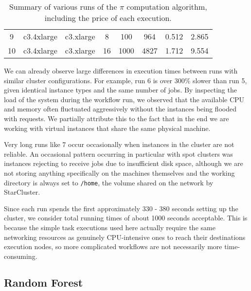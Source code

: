 \begin{table}[h]
\begin{adjustbox}{width=1\textwidth}
\begin{tabular}{cccccccc}
\multicolumn{1}{c|}{9} & \multicolumn{1}{c|}{c3.4xlarge} & \multicolumn{1}{c|}{c3.xlarge} & \multicolumn{1}{c|}{8} & \multicolumn{1}{c|}{100} & \multicolumn{1}{c|}{964} & \multicolumn{1}{c|}{0.512} & \multicolumn{1}{c|}{2.865} \\ \cline{2-8} 
\multicolumn{1}{c|}{10} & \multicolumn{1}{c|}{c3.4xlarge} & \multicolumn{1}{c|}{c3.xlarge} & \multicolumn{1}{c|}{16} & \multicolumn{1}{c|}{1000} & \multicolumn{1}{c|}{4827} & \multicolumn{1}{c|}{1.712} & \multicolumn{1}{c|}{9.554} \\ \cline{2-8} 
\end{tabular}
\end{adjustbox}
\caption{Summary of various runs of the $\pi$ computation algorithm, including the price of each execution.}
\label{PiTable}
\end{table}

We can already observe large differences in execution times between runs with similar cluster configurations. For example, run 6 is over 300\% slower than run 5, given identical instance types and the same number of jobs. By inspecting the load of the system during the workflow run, we observed that the available CPU and memory often fluctuated aggressively without the instances being flooded with requests. We partially attribute this to the fact that in the end we are working with virtual instances that share the same physical machine.

Very long runs like 7 occur occasionally when instances in the cluster are not reliable. An occasional pattern occurring in particular with spot clusters was instances rejecting to receive jobs due to insufficient disk space, although we are not storing anything specifically on the machines themselves and the working directory is always set to \verb|/home|, the volume shared on the network by StarCluster.

Since each run spends the first approximately 330 - 380 seconds setting up the cluster, we consider total running times of about 1000 seconds acceptable. This is because the simple task executions used here actually require the same networking resources as genuinely CPU-intensive ones to reach their destinations execution nodes, so more complicated workflows are not necessarily more time-consuming.

\subsection{Random Forest}


